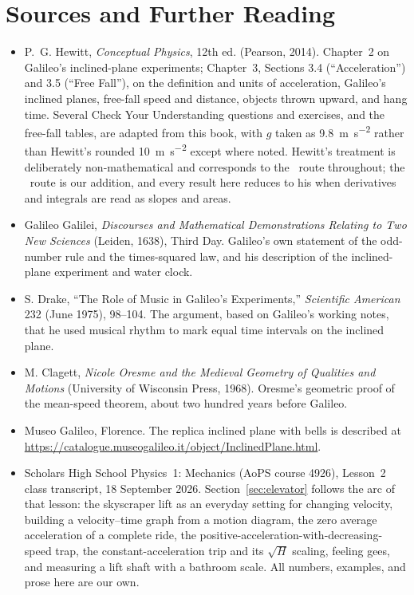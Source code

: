 \documentclass[11pt,twoside,openany]{book}
\newcommand{\viewtag}[3]{\fcolorbox{#2}{#3}{\footnotesize\textbf{\textcolor{#2}{#1}}}}
\newcommand{\elemtag}{\viewtag{Elementary}{elemcol}{elempale}}
\newcommand{\calctag}{\viewtag{Calculus}{calccol}{calcpale}}
\begin{document}
\section*{Sources and Further Reading}
\begin{itemize}[itemsep=3pt]
  \item P.~G. Hewitt, \emph{Conceptual Physics}, 12th ed. (Pearson, 2014). Chapter~2 on Galileo's inclined-plane experiments; Chapter~3, Sections 3.4 (``Acceleration'') and 3.5 (``Free Fall''), on the definition and units of acceleration, Galileo's inclined planes, free-fall speed and distance, objects thrown upward, and hang time. Several Check Your Understanding questions and exercises, and the free-fall tables, are adapted from this book, with $g$ taken as \SI{9.8}{\metre\per\second\squared} rather than Hewitt's rounded \SI{10}{\metre\per\second\squared} except where noted. Hewitt's treatment is deliberately non-mathematical and corresponds to the \elemtag\ route throughout; the \calctag\ route is our addition, and every result here reduces to his when derivatives and integrals are read as slopes and areas.
  \item Galileo Galilei, \emph{Discourses and Mathematical Demonstrations Relating to Two New Sciences} (Leiden, 1638), Third Day. Galileo's own statement of the odd-number rule and the times-squared law, and his description of the inclined-plane experiment and water clock.
  \item S. Drake, ``The Role of Music in Galileo's Experiments,'' \emph{Scientific American} 232 (June 1975), 98--104. The argument, based on Galileo's working notes, that he used musical rhythm to mark equal time intervals on the inclined plane.
  \item M. Clagett, \emph{Nicole Oresme and the Medieval Geometry of Qualities and Motions} (University of Wisconsin Press, 1968). Oresme's geometric proof of the mean-speed theorem, about two hundred years before Galileo.
  \item Museo Galileo, Florence. The replica inclined plane with bells is described at \url{https://catalogue.museogalileo.it/object/InclinedPlane.html}.
  \item Scholars High School Physics~1: Mechanics (AoPS course 4926), Lesson~2 class transcript, 18 September 2026. Section~\ref{sec:elevator} follows the arc of that lesson: the skyscraper lift as an everyday setting for changing velocity, building a velocity--time graph from a motion diagram, the zero average acceleration of a complete ride, the positive-acceleration-with-decreasing-speed trap, the constant-acceleration trip and its $\sqrt{H}$ scaling, feeling gees, and measuring a lift shaft with a bathroom scale. All numbers, examples, and prose here are our own.

\end{itemize}
\end{document}
